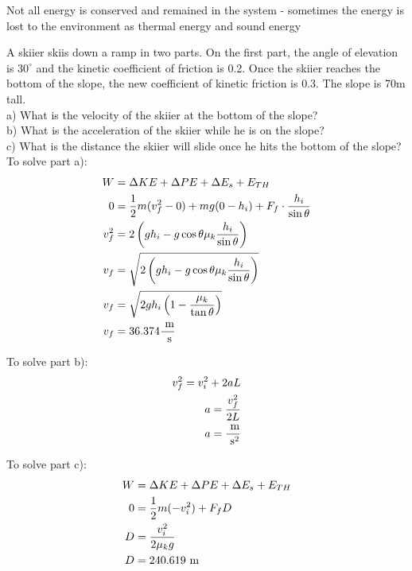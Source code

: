 Not all energy is conserved and remained in the system - sometimes the energy is lost to the environment as thermal energy and sound energy


\begin{problem}
    A skiier skiis down a ramp in two parts. On the first part, the angle of elevation is $30^\circ$ and the kinetic coefficient of friction is 0.2. Once the skiier reaches the bottom of the slope, the new coefficient of kinetic friction is 0.3. The slope is 70m tall.\\

    a) What is the velocity of the skiier at the bottom of the slope?\\

    b) What is the acceleration of the skiier while he is on the slope?\\

    c) What is the distance the skiier will slide once he hits the bottom of the slope?\\

    To solve part a):
    $$
    \begin{aligned}
        W &= \Delta KE + \Delta PE + \Delta E_s + E_{TH}\\
        0 &= \frac{1}{2}m(v_f^2-0) + mg(0-h_i) + F_f\cdot\frac{h_i}{\sin\theta}\\
        v_f^2 &= 2\left(gh_i - g\cos\theta\mu_k\frac{h_i}{\sin\theta}\right)\\
        v_f &= \sqrt{2\left(gh_i - g\cos\theta\mu_k\frac{h_i}{\sin\theta}\right)}\\
        v_f &= \sqrt{2gh_i\left(1 - \frac{\mu_k}{\tan\theta}\right)}\\
        v_f &= 36.374 \frac{\text{ m}}{\text{ s}}
    \end{aligned}
    $$

    To solve part b):
    $$
    \begin{aligned}
        v_f^2 = v_i^2 + 2aL\\
        a = \frac{v_f^2}{2L}\\
        a = \frac{\text{ m}}{\text{ s}^2}
    \end{aligned}
    $$

    To solve part c):
    $$
    \begin{aligned}
        W &= \Delta KE + \Delta PE + \Delta E_s + E_{TH}\\
        0 &= \frac{1}{2}m(-v_i^2)+F_fD\\
        D &= \frac{v_i^2}{2\mu_kg}\\
        D &= 240.619\text{ m}
    \end{aligned}
    $$
\end{problem}


